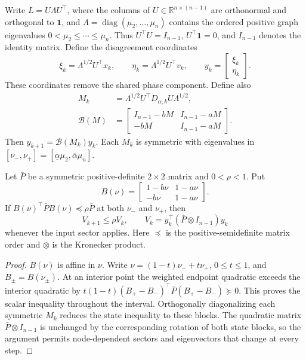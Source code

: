 Write $L=U\Lambda U^\top$, where the columns of
$U\in\mathbb R^{n\times(n-1)}$ are orthonormal and orthogonal to
$\mathbf1$, and $\Lambda=\operatorname{diag}(\mu_2,\ldots,\mu_n)$
contains the ordered positive graph eigenvalues
$0<\mu_2\le\cdots\le\mu_n$. Thus $U^\top U=I_{n-1}$,
$U^\top\mathbf1=0$, and $I_{n-1}$ denotes the identity matrix.
Define the disagreement coordinates
\begin{equation}
 \xi_k=\Lambda^{1/2}U^\top x_k,\qquad
 \eta_k=\Lambda^{1/2}U^\top v_k,\qquad
 y_k=\begin{bmatrix}\xi_k\\\eta_k\end{bmatrix}.
 \label{eq:btd_projection}
\end{equation}
These coordinates remove the shared phase component. Define also
\begin{align}
 M_k&=\Lambda^{1/2}U^\top D_{\alpha,k}U\Lambda^{1/2},\nonumber\\
 \mathcal B(M)&=
 \begin{bmatrix}I_{n-1}-bM&I_{n-1}-aM\\-bM&I_{n-1}-aM\end{bmatrix}.
 \label{eq:btd_matrix_dynamics}
\end{align}
Then $y_{k+1}=\mathcal B(M_k)y_k$. Each $M_k$ is symmetric with
eigenvalues in $[\nu_-,\nu_+]=[\underline\alpha\mu_2,
\overline\alpha\mu_n]$.

\begin{btdlemma}
\label{lem:btd_endpoint}
Let $\bar P$ be a symmetric posi\-tive-definite $2\times2$ matrix and
$0<\rho<1$. Put
\begin{equation}
 B(\nu)=\begin{bmatrix}1-b\nu&1-a\nu\\-b\nu&1-a\nu\end{bmatrix}.
 \label{eq:btd_scalar_block}
\end{equation}
If $B(\nu)^\top\bar P B(\nu)\preceq\rho\bar P$ at both
$\nu_-$ and $\nu_+$, then
\begin{equation}
 V_{k+1}\le\rho V_k,\qquad
 V_k=y_k^\top(\bar P\otimes I_{n-1})y_k
 \label{eq:btd_contraction}
\end{equation}
whenever the input sector applies. Here $\preceq$ is the positive-semidefinite
matrix order and $\otimes$ is the Kronecker product.
\end{btdlemma}
\begin{proof}
$B(\nu)$ is affine in $\nu$. Write
$\nu=(1-t)\nu_-+t\nu_+$, $0\le t\le1$, and $B_\pm=B(\nu_\pm)$.
At an interior point the weighted endpoint
quadratic exceeds the interior quadratic by
$t(1-t)(B_+-B_-)^\top\bar P(B_+-B_-)\succeq0$.
This proves the scalar inequality throughout the interval. Orthogonally
diagonalizing each symmetric $M_k$ reduces the state inequality to these
blocks. The quadratic matrix $\bar P\otimes I_{n-1}$ is unchanged by
the corresponding rotation of both state blocks, so the argument permits
node-dependent sectors and eigenvectors that change at every step.
\end{proof}

